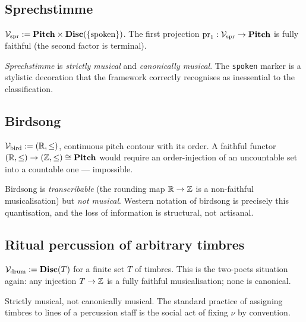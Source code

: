 \subsection{Sprechstimme}
$\mathcal{V}_{\mathrm{spr}} := \mathbf{Pitch} \times \mathbf{Disc}(\{\mathrm{spoken}\})$. The
first projection $\mathrm{pr}_1 : \mathcal{V}_{\mathrm{spr}} \to \mathbf{Pitch}$ is
fully faithful (the second factor is terminal).

\begin{verdict}
\emph{Sprechstimme} is \emph{strictly musical} and \emph{canonically
musical}. The \texttt{spoken} marker is a stylistic decoration that
the framework correctly recognises as inessential to the
classification.
\end{verdict}

\subsection{Birdsong}
$\mathcal{V}_{\mathrm{bird}} := (\mathbb{R}, \leq)$, continuous pitch contour with its
order. A faithful functor $(\mathbb{R}, \leq) \to (\mathbb{Z}, \leq) \cong \mathbf{Pitch}$
would require an order-injection of an uncountable set into a
countable one — impossible.

\begin{verdict}
Birdsong is \emph{transcribable} (the rounding map
$\mathbb{R} \to \mathbb{Z}$ is a non-faithful musicalisation) but
\emph{not musical}. Western notation of birdsong is precisely this
quantisation, and the loss of information is structural, not
artisanal.
\end{verdict}

\subsection{Ritual percussion of arbitrary timbres}
$\mathcal{V}_{\mathrm{drum}} := \mathbf{Disc}(T)$ for a finite set $T$ of timbres.
This is the two-poets situation again: any injection $T \to \mathbb{Z}$ is a
fully faithful musicalisation; none is canonical.

\begin{verdict}
Strictly musical, not canonically musical. The standard practice of
assigning timbres to lines of a percussion staff is the social act of
fixing $\nu$ by convention.
\end{verdict}

